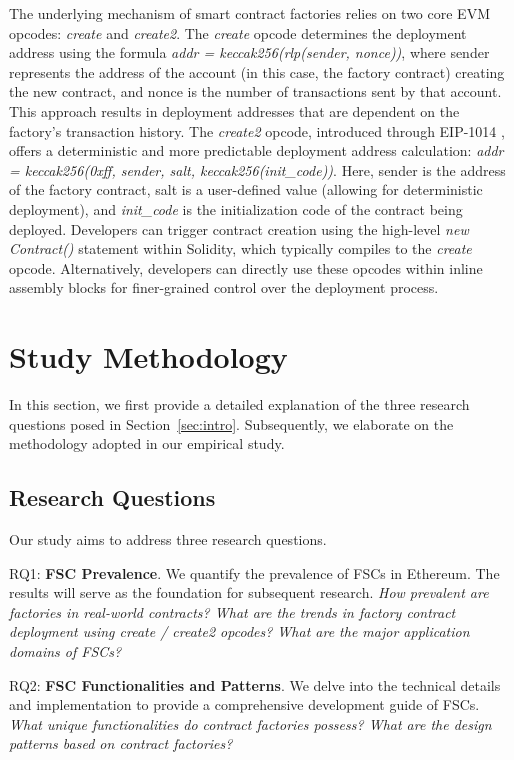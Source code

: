 \documentclass[acmsmall,screen]{acmart}
\begin{document}
	The underlying mechanism of smart contract factories relies on two core EVM opcodes: \textit{create} and \textit{create2}. The \textit{create} opcode determines the deployment address using the formula \textit{addr = keccak256(rlp(sender, nonce))}, where sender represents the address of the account (in this case, the factory contract) creating the new contract, and nonce is the number of transactions sent by that account. This approach results in deployment addresses that are dependent on the factory's transaction history. The \textit{create2} opcode, introduced through EIP-1014 \cite{eip-1014}, offers a deterministic and more predictable deployment address calculation: \textit{addr = keccak256(0xff, sender, salt, keccak256(init\_code))}. Here, sender is the address of the factory contract, salt is a user-defined value (allowing for deterministic deployment), and \textit{init\_code} is the initialization code of the contract being deployed. Developers can trigger contract creation using the high-level \textit{new Contract()} statement within Solidity, which typically compiles to the \textit{create} opcode. Alternatively, developers can directly use these opcodes within inline assembly blocks for finer-grained control over the deployment process.


	\section{Study Methodology}\label{sec:methodology}
	In this section, we first provide a detailed explanation of the three research questions posed in Section~\ref{sec:intro}. Subsequently, we elaborate on the methodology adopted in our empirical study.
	\subsection{Research Questions}
	Our study aims to address three research questions.

	RQ1:\textbf{ FSC Prevalence}. We quantify the prevalence of FSCs in Ethereum. The results will serve as the foundation for subsequent research. \textit{How prevalent are factories in real-world contracts? What are the trends in factory contract deployment using create / create2 opcodes? What are the major application domains of FSCs?}

	RQ2: \textbf{FSC Functionalities and Patterns}. We delve into the technical details and implementation to provide a comprehensive development guide of FSCs. \textit{What unique functionalities do contract factories possess? What are the design patterns based on contract factories?}
\end{document}
